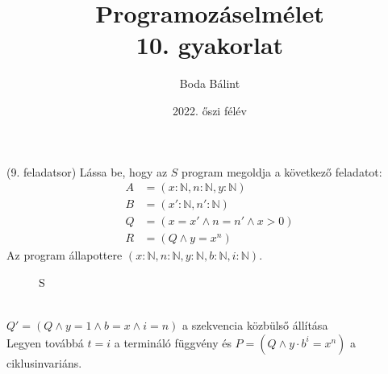 \documentclass[a4paper,12pt]{article}
\title{\huge{Programozáselmélet} \\[-4pt] \large 10. gyakorlat \vspace{-15pt}}
\author{Boda Bálint}
\date{\vspace{-12pt}2022. őszi félév}
\begin{document}
    \maketitle
    \vspace{-10pt}
\begin{question}(9. feladatsor)
	Lássa be, hogy az $S$ program megoldja a következő feladatot:
	\begin{align*}
		A &= \left( x: \mathbb{N}, n: \mathbb{N}, y: \mathbb{N} \right) \\
		B &= \left( x': \mathbb{N}, n': \mathbb{N} \right) \\
		Q &= (x = x' \land  n = n' \land x > 0) \\
		R &= (Q \land y = x^n )
	\end{align*}
	Az program állapottere $ \left( x: \mathbb{N}, n: \mathbb{N}, y: \mathbb{N}, b: \mathbb{N}, i: \mathbb{N} \right) $.

	\begin{wrapfigure}[3]{l}{7cm}
			\vspace{-2\baselineskip}
		\begin{stuki*}[7cm]{S}
			\begin{WHILE}{2}{}
				\begin{CASE}{1}{2}
				\end{CASE}
			\end{WHILE}
		\end{stuki*}
	\end{wrapfigure}
	\noindent
	\\[19pt]
	$Q' = ( Q \land y=1 \land b = x \land i = n ) $ a szekvencia közbülső állítása
	\\[34pt]
	\noindent
	Legyen továbbá $ t = i $ a termináló függvény és $ P = ( Q \land y \cdot b^i = x^n ) $ a ciklusinvariáns.
	\vspace{-40pt}
	\begin{align*}
	\end{align*}
	\end{question}
\end{document}
